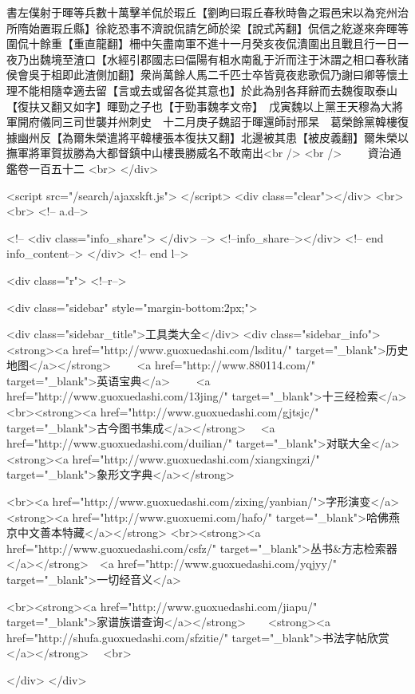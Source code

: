 書左僕射于暉等兵數十萬擊羊侃於瑕丘【劉昫曰瑕丘春秋時魯之瑕邑宋以為兖州治所隋始置瑕丘縣】徐紇恐事不濟說侃請乞師於梁【說式芮翻】侃信之紇遂來奔暉等圍侃十餘重【重直龍翻】柵中矢盡南軍不進十一月癸亥夜侃潰圍出且戰且行一日一夜乃出魏境至渣口【水經引郡國志曰偪陽有柤水南亂于沂而注于沐謂之相口春秋諸侯會吳于柤即此渣側加翻】衆尚萬餘人馬二千匹士卒皆竟夜悲歌侃乃謝曰卿等懷土理不能相隨幸適去留【言或去或留各從其意也】於此為别各拜辭而去魏復取泰山【復扶又翻又如字】暉勁之子也【于勁事魏孝文帝】　戊寅魏以上黨王天穆為大將軍開府儀同三司世襲并州刺史　十二月庚子魏詔于暉還師討邢杲　葛榮餘黨韓樓復據幽州反【為爾朱榮遣將平韓樓張本復扶又翻】北邊被其患【被皮義翻】爾朱榮以撫軍將軍賀拔勝為大都督鎮中山樓畏勝威名不敢南出<br />
<br />
　　資治通鑑卷一百五十二  <br>
   </div> 

<script src="/search/ajaxskft.js"> </script>
 <div class="clear"></div>
<br>
<br>
 <!-- a.d-->

 <!--
<div class="info_share">
</div> 
-->
 <!--info_share--></div>   <!-- end info_content-->
  </div> <!-- end l-->

<div class="r">   <!--r-->



<div class="sidebar"  style="margin-bottom:2px;">

 
<div class="sidebar_title">工具类大全</div>
<div class="sidebar_info">
<strong><a href="http://www.guoxuedashi.com/lsditu/" target="_blank">历史地图</a></strong>　　
<a href="http://www.880114.com/" target="_blank">英语宝典</a>　　
<a href="http://www.guoxuedashi.com/13jing/" target="_blank">十三经检索</a>　
<br><strong><a href="http://www.guoxuedashi.com/gjtsjc/" target="_blank">古今图书集成</a></strong>　
<a href="http://www.guoxuedashi.com/duilian/" target="_blank">对联大全</a>　<strong><a href="http://www.guoxuedashi.com/xiangxingzi/" target="_blank">象形文字典</a></strong>　

<br><a href="http://www.guoxuedashi.com/zixing/yanbian/">字形演变</a>　　<strong><a href="http://www.guoxuemi.com/hafo/" target="_blank">哈佛燕京中文善本特藏</a></strong>
<br><strong><a href="http://www.guoxuedashi.com/csfz/" target="_blank">丛书&方志检索器</a></strong>　<a href="http://www.guoxuedashi.com/yqjyy/" target="_blank">一切经音义</a>　　

<br><strong><a href="http://www.guoxuedashi.com/jiapu/" target="_blank">家谱族谱查询</a></strong>　　<strong><a href="http://shufa.guoxuedashi.com/sfzitie/" target="_blank">书法字帖欣赏</a></strong>　
<br>

</div>
</div>


